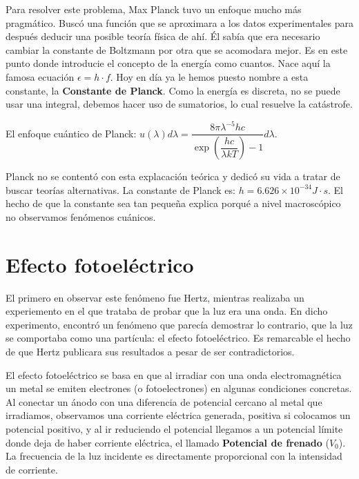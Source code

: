 \documentclass{report}
\begin{document}
    \vspace{0.4cm} \noindent Para resolver este problema, Max Planck tuvo un enfoque mucho más pragmático. Buscó una función que se aproximara a los datos experimentales para después deducir
    una posible teoría física de ahí. Él sabía que era necesario cambiar la constante de Boltzmann por otra que se acomodara mejor. Es en este punto donde introducie
    el concepto de la energía como cuantos. Nace aquí la famosa ecuación $\epsilon = h\cdot f$. Hoy en día ya le hemos puesto nombre a esta constante, la 
    \textbf{Constante de Planck}. Como la energía es discreta, no se puede usar una integral, debemos hacer uso de sumatorios, lo cual resuelve la catástrofe.

    \vspace{0.4cm} \noindent El enfoque cuántico de Planck: $u(\lambda)d\lambda=\dfrac{8\pi\lambda^{-5}hc}{\exp\left(\dfrac{hc}{\lambda k T}\right)-1}d\lambda$. 
    
    \vspace{0.1cm}\noindent Planck no se contentó con esta explacación teórica y dedicó su vida a tratar de buscar teorías alternativas.
    La constante de Planck es: $h=6.626\times10^{-34}J\cdot s$. El hecho de que la constante sea tan pequeña explica porqué a nivel 
    macroscópico no observamos fenómenos cuánicos.
  \section{Efecto fotoeléctrico}
    \noindent El primero en observar este fenómeno fue Hertz, mientras realizaba un experiemento en el que trataba de probar que la luz era una onda. En dicho experimento,
    encontró un fenómeno que parecía demostrar lo contrario, que la luz se comportaba como una partícula: el efecto fotoeléctrico. Es remarcable el hecho de que Hertz
    publicara sus resultados a pesar de ser contradictorios.

    \vspace{0.4cm} \noindent El efecto fotoeléctrico se basa en que al irradiar con una onda electromagnética un metal se emiten electrones (o fotoelectrones) en algunas condiciones concretas.
    Al conectar un ánodo con una diferencia de potencial cercano al metal que irradiamos, observamos una corriente eléctrica generada, positiva si colocamos un 
    potencial positivo, y al ir reduciendo el potencial llegamos a un potencial límite donde deja de haber corriente eléctrica, el llamado \textbf{Potencial de
    frenado} ($V_0$). La frecuencia de la luz incidente es directamente proporcional con la intensidad de corriente. 
    
\end{document}
